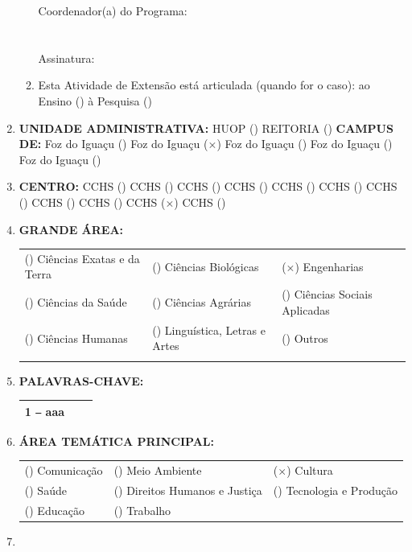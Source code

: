\documentclass[12pt,a4paper,oneside]{article}%
\begin{document}
\begin{enumerate}
\begin{mdframed}[innertopmargin=5pt, innerleftmargin=3pt, innerrightmargin=3pt]
\begin{enumerate}
            Coordenador(a) do Programa: \\ \\ \\
            Assinatura: \hrulefill \\
\item%
Esta Atividade de Extensão está articulada (quando for o caso): ao Ensino () à Pesquisa ()%
\end{enumerate}%
\end{mdframed}%
\item%
\textbf{UNIDADE ADMINISTRATIVA: }%
HUOP () %
REITORIA () %
\newline%
\textbf{CAMPUS DE: }%
Foz do Iguaçu () %
Foz do Iguaçu ($\times$) %
Foz do Iguaçu () %
Foz do Iguaçu () %
Foz do Iguaçu () %
\item%
\textbf{CENTRO: }%
\newline%
CCHS () %
CCHS () %
CCHS () %
CCHS () %
CCHS () %
CCHS () %
CCHS () %
CCHS () %
CCHS () %
CCHS ($\times$) %
CCHS () %
\item%
\textbf{GRANDE ÁREA: }%
\newline%
\begin{tabularx}{\linewidth}{|X|X|X|}%
\hline%
() Ciências Exatas e da Terra&() Ciências Biológicas&($\times$) Engenharias\\%
() Ciências da Saúde&() Ciências Agrárias&() Ciências Sociais Aplicadas\\%
() Ciências Humanas&() Linguística, Letras e Artes&() Outros\\%
&&\\%
\hline%
\end{tabularx}%
\item%
\textbf{PALAVRAS{-}CHAVE: }%
\newline%
\begin{tabularx}{\linewidth}{|X|X|X|}%
\hline%
1 ‒ aaa&&\\%
\hline%
\end{tabularx}%
\item%
\textbf{ÁREA TEMÁTICA PRINCIPAL: }%
\newline%
\begin{tabularx}{\linewidth}{|X|X|X|}%
\hline%
() Comunicação&() Meio Ambiente&($\times$) Cultura\\%
() Saúde&() Direitos Humanos e Justiça&() Tecnologia e Produção\\%
() Educação&() Trabalho&\\%
\hline%
\end{tabularx}%
\item%

\end{enumerate}
\end{document}
